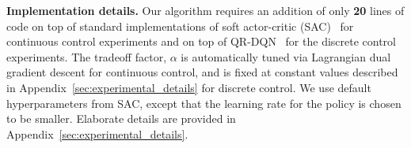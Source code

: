 \textbf{Implementation details.} Our algorithm requires an addition of only \textbf{20} lines of code on top of standard implementations of soft actor-critic (SAC)~\citep{haarnoja} for continuous control experiments and on top of QR-DQN~\citep{dabney2018distributional} for the discrete control experiments. The tradeoff factor, $\alpha$ is automatically tuned via Lagrangian dual gradient descent for continuous control, and is fixed at constant values described in Appendix~\ref{sec:experimental_details} for discrete control. We use default hyperparameters from SAC, except that the learning rate for the policy is chosen to be smaller. Elaborate details are provided in Appendix~\ref{sec:experimental_details}.  
